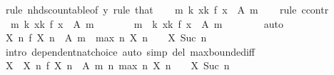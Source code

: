 \begin{isabellebody}
\ {\isacharparenleft}{\kern0pt}rule\ nhds{\isacharunderscore}{\kern0pt}countable{\isacharbrackleft}{\kern0pt}of\ y{\isacharbrackright}{\kern0pt}{\isacharparenright}{\kern0pt}\ {\isacharparenleft}{\kern0pt}rule\ that{\isacharparenright}{\kern0pt}\isanewline
\isanewline
\ \ \isamarkupfalse%
\ {\isachardoublequoteopen}{\isasymforall}m{\isachardot}{\kern0pt}\ {\isasymexists}k{\isachardot}{\kern0pt}\ {\isasymforall}x{\isasymge}k{\isachardot}{\kern0pt}\ f\ x\ {\isasymin}\ A\ m{\isachardoublequoteclose}\isanewline
\ \ \isamarkupfalse%
\ {\isacharparenleft}{\kern0pt}rule\ ccontr{\isacharparenright}{\kern0pt}\isanewline
\ \ \ \ \isamarkupfalse%
\ {\isachardoublequoteopen}{\isasymnot}\ {\isacharparenleft}{\kern0pt}{\isasymforall}m{\isachardot}{\kern0pt}\ {\isasymexists}k{\isachardot}{\kern0pt}\ {\isasymforall}x{\isasymge}k{\isachardot}{\kern0pt}\ f\ x\ {\isasymin}\ A\ m{\isacharparenright}{\kern0pt}{\isachardoublequoteclose}\isanewline
\ \ \ \ \isamarkupfalse%
\ \isamarkupfalse%
\ m\ \ {\isachardoublequoteopen}{\isasymAnd}k{\isachardot}{\kern0pt}\ {\isasymexists}x{\isasymge}k{\isachardot}{\kern0pt}\ f\ x\ {\isasymnotin}\ A\ m{\isachardoublequoteclose}\isanewline
\ \ \ \ \ \ \isamarkupfalse%
\ auto\isanewline
\ \ \ \ \isamarkupfalse%
\ \isamarkupfalse%
\ {\isachardoublequoteopen}{\isasymexists}X{\isachardot}{\kern0pt}\ {\isasymforall}n{\isachardot}{\kern0pt}\ {\isacharparenleft}{\kern0pt}f\ {\isacharparenleft}{\kern0pt}X\ n{\isacharparenright}{\kern0pt}\ {\isasymnotin}\ A\ m{\isacharparenright}{\kern0pt}\ {\isasymand}\ max\ n\ {\isacharparenleft}{\kern0pt}X\ n{\isacharparenright}{\kern0pt}\ {\isacharplus}{\kern0pt}\ {}\ {\isasymle}\ X\ {\isacharparenleft}{\kern0pt}Suc\ n{\isacharparenright}{\kern0pt}{\isachardoublequoteclose}\isanewline
\ \ \ \ \ \ \isamarkupfalse%
\ {\isacharparenleft}{\kern0pt}intro\ dependent{\isacharunderscore}{\kern0pt}nat{\isacharunderscore}{\kern0pt}choice{\isacharparenright}{\kern0pt}\ {\isacharparenleft}{\kern0pt}auto\ simp\ del{\isacharcolon}{\kern0pt}\ max{\isachardot}{\kern0pt}bounded{\isacharunderscore}{\kern0pt}iff{\isacharparenright}{\kern0pt}\isanewline
\ \ \ \ \isamarkupfalse%
\ \isamarkupfalse%
\ X\ \ X{\isacharcolon}{\kern0pt}\ {\isachardoublequoteopen}{\isasymAnd}n{\isachardot}{\kern0pt}\ f\ {\isacharparenleft}{\kern0pt}X\ n{\isacharparenright}{\kern0pt}\ {\isasymnotin}\ A\ m{\isachardoublequoteclose}\ {\isachardoublequoteopen}{\isasymAnd}n{\isachardot}{\kern0pt}\ max\ n\ {\isacharparenleft}{\kern0pt}X\ n{\isacharparenright}{\kern0pt}\ {\isacharplus}{\kern0pt}\ {}\ {\isasymle}\ X\ {\isacharparenleft}{\kern0pt}Suc\ n{\isacharparenright}{\kern0pt}{\isachardoublequoteclose}\isanewline

\end{isabellebody}
